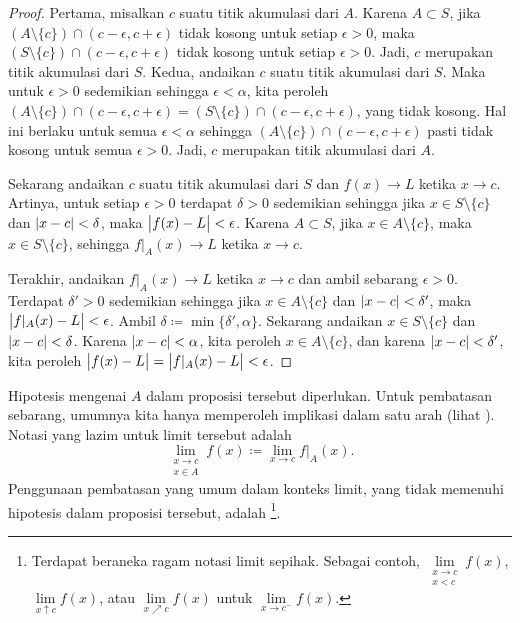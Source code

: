 \begin{proof}
Pertama, misalkan $c$ suatu titik akumulasi dari $A$.
Karena $A \subset S$, jika $( A \setminus \{ c\} ) \cap
(c-\epsilon,c+\epsilon)$ tidak kosong untuk setiap $\epsilon > 0$,
maka $( S \setminus \{ c\} ) \cap
(c-\epsilon,c+\epsilon)$ tidak kosong untuk setiap $\epsilon > 0$.
Jadi, $c$ merupakan titik akumulasi dari $S$.
Kedua, andaikan $c$ suatu titik akumulasi
dari $S$.  Maka untuk $\epsilon > 0$ sedemikian sehingga $\epsilon < \alpha$,
kita peroleh $( A \setminus \{ c\} ) \cap (c-\epsilon,c+\epsilon) =
( S \setminus \{ c\} ) \cap (c-\epsilon,c+\epsilon)$, yang tidak kosong.  Hal ini berlaku untuk semua
$\epsilon < \alpha$ sehingga
$( A \setminus \{ c\} ) \cap (c-\epsilon,c+\epsilon)$ pasti tidak kosong untuk semua
$\epsilon > 0$.  Jadi, $c$ merupakan titik akumulasi dari $A$.

Sekarang andaikan $c$ suatu titik akumulasi dari $S$ dan $f(x) \to L$ ketika $x \to c$.  Artinya, untuk setiap $\epsilon > 0$
terdapat $\delta > 0$ sedemikian sehingga jika $x \in S \setminus \{ c \}$
dan $\lvert {x-c} \rvert < \delta$, maka $\bigl\lvert {f(x)-L} \bigr\rvert < \epsilon$.  Karena $A \subset S$,
jika $x \in A \setminus \{ c \}$, maka $x \in S \setminus \{ c \}$,
sehingga $f|_A(x) \to L$ ketika $x \to c$.

Terakhir, andaikan $f|_A(x) \to L$ ketika $x \to c$ dan ambil sebarang
$\epsilon > 0$.
Terdapat $\delta' > 0$ sedemikian sehingga jika $x \in A \setminus \{ c \}$
dan $\lvert {x-c} \rvert < \delta'$, maka $\bigl\lvert { f|_A(x)-L } \bigr\rvert < \epsilon$.
Ambil $\delta \coloneqq \min \{ \delta', \alpha \}$.
Sekarang andaikan $x \in S \setminus \{ c \}$ dan
$\lvert {x-c} \rvert < \delta$.  Karena $\lvert {x-c} \rvert < \alpha$, kita peroleh $x \in A \setminus \{ c \}$,
dan karena $\lvert {x-c} \rvert < \delta'$,
kita peroleh $\bigl\lvert {f(x)-L} \bigr\rvert = \bigl\lvert { f|_A(x)-L } \bigr\rvert < \epsilon$.
\end{proof}

Hipotesis mengenai $A$ dalam proposisi tersebut diperlukan.  Untuk pembatasan
sebarang, umumnya kita hanya memperoleh implikasi dalam satu arah
(lihat ).
Notasi yang lazim untuk limit tersebut adalah
\begin{equation*}
\lim_{\substack{x \to c\\x \in A}} f(x) \coloneqq \lim_{x \to c} f|_A(x) .
\end{equation*}
Penggunaan pembatasan yang umum dalam konteks limit, yang tidak memenuhi
hipotesis dalam proposisi tersebut, adalah
\emph{}%
\footnote{%
Terdapat beraneka ragam notasi limit sepihak.
Sebagai contoh,
$\lim\limits_{\substack{x \to c\\x < c}} f(x)$,
$\lim\limits_{x \uparrow c} f(x)$, atau
$\lim\limits_{x \nearrow c} f(x)$ untuk
$\lim\limits_{x \to c^-} f(x)$.}.

